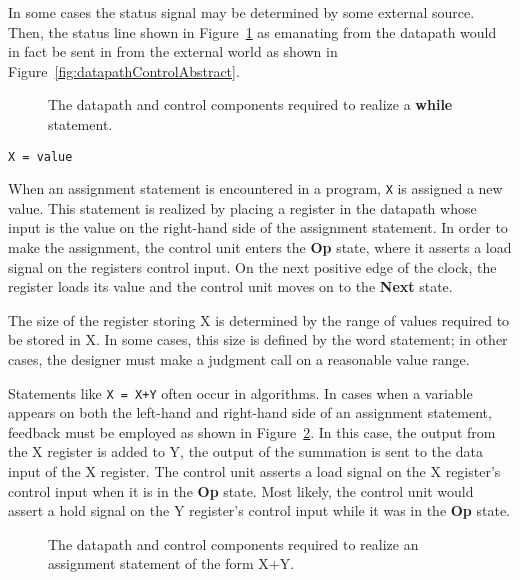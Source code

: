 \begin{description}
        In some cases the status signal may be determined by some external
        source.  Then, the status line shown in Figure~\ref{fig:datapathControlWhile}
        as emanating from the datapath would in fact be sent in from the
        external world as shown in Figure~\ref{fig:datapathControlAbstract}.

        \begin{figure}[ht]
            \caption{The datapath and control components required to realize
            a \textbf{ while} statement.}
            \label{fig:datapathControlWhile}
        \end{figure}

    \item[]\verb^X = value^

        When an assignment statement is encountered in a program,
        \verb^X^ is assigned a new value.  This statement is realized by
        placing a register in the datapath whose input is the
        value on the right-hand side of the assignment statement.
        In order to make the assignment, the control unit
        enters the \textbf{ Op} state, where it asserts a load signal on the
        registers control input.  On the next positive edge of the
        clock, the register loads its value and the control unit
        moves on to the \textbf{ Next} state.

        The size of the register storing X is determined by the range
        of values  required to be stored in X.  In some
        cases, this size is defined by the word statement; in
        other cases, the designer must make a judgment call on a reasonable
        value range.

        Statements like \verb^X = X+Y^ often occur in
        algorithms.  In cases when a variable appears on both the left-hand
        and right-hand side of an assignment statement, feedback must
        be employed as shown in Figure~\ref{fig:datapathControlOp}.  In this case, the
        output from the X register is added to Y, the output of the summation
        is sent to the data input of the X register.  The control unit
        asserts a load signal on the X register's control input when
        it is in the \textbf{ Op} state.  Most likely, the control unit would assert
        a hold signal on the Y register's control input while it
        was in the \textbf{ Op} state.

        \begin{figure}[ht]
            \center{\texttt{[image: Op]}}
            \caption{The datapath and control components required to realize
            an assignment statement of the form X+Y.}
            \label{fig:datapathControlOp}
        \end{figure}


\end{description}
